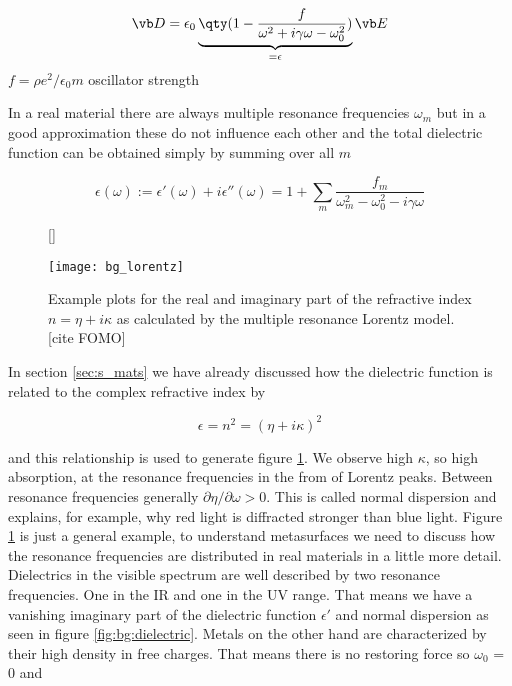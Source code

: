 \begin{equation}
    \vb D = 
    \epsilon_0 \underbrace{ 
    \qty(1 - \frac{f}{\omega^2 + i \gamma \omega - \omega_0^2})
    }_{
        =\epsilon
    }
    \vb E
\end{equation}
\indent
$f = \rho e^2 / \epsilon_0 m$ oscillator strength

In a real material there are always multiple resonance frequencies $\omega_m$ but in a good approximation these do not influence each other and the total dielectric function can be obtained simply by summing over all $m$

\begin{equation}
    \epsilon(\omega) := 
    \epsilon'(\omega) + i \epsilon''(\omega) = 
    1 + \sum_m \frac{f_m}{\omega_m^2 - \omega_0^2 - i \gamma \omega}
\end{equation}

\begin{figure}[H]
    [\FBwidth]
    {\caption{
        Example plots for the real and imaginary part of the refractive index 
        $n = \eta + i\kappa$
        as calculated by the multiple resonance Lorentz model.
        [cite FOMO]
    }
    \label{fig:bg:lorentz}}
    {\texttt{[image: bg\_lorentz]}}
\end{figure}

In section \ref{sec:s_mats} we have already discussed how the dielectric function is related to the complex refractive index by 

\begin{equation}
    \epsilon = n^2 = (\eta + i \kappa)^2
\end{equation}

and this relationship is used to generate figure \ref{fig:bg:lorentz}. We observe high $\kappa$, so high absorption, at the resonance frequencies in the from of Lorentz peaks. Between resonance frequencies generally 
$\partial \eta / \partial \omega > 0$.
This is called normal dispersion and explains, for example, why red light is diffracted stronger than blue light.
Figure \ref{fig:bg:lorentz} is just a general example, to understand metasurfaces we need to discuss how the resonance frequencies are distributed in real materials in a little more detail.
\\

\indent
Dielectrics in the visible spectrum are well described by two resonance frequencies. One in the IR and one in the UV range. That means we have a vanishing imaginary part of the dielectric function $\epsilon'$ and normal dispersion as seen in figure \ref{fig:bg:dielectric}. 
Metals on the other hand are characterized by their high density in free charges. That means there is no restoring force so 
$\omega_0$ = 0 and 

